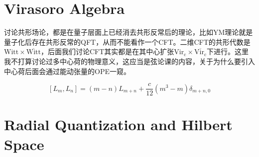 \section{Virasoro Algebra}
讨论共形场论，都是在量子层面上已经消去共形反常后的理论，比如YM理论就是量子化后存在共形反常的QFT，从而不能看作一个CFT。二维CFT的共形代数是$\mathrm{Witt}\times\overline{\mathrm{Witt}}$，后面我们讨论CFT其实都是在其中心扩张$\mathrm{Vir_c}\times\overline{\mathrm{Vir_c}}$下进行。这里我不打算讨论过多中心荷的物理意义，这应当是弦论课的内容，关于为什么要引入中心荷后面会通过能动张量的OPE一窥。
\begin{theorem}
	\begin{equation}
		\boxed{
		\left[L_m,L_n\right]=\left(m-n\right)L_{m+n}+\frac c{12}\left(m^3-m\right)\delta_{m+n,0}
		}
	\end{equation}
\end{theorem}
\section{Radial Quantization and Hilbert Space}
